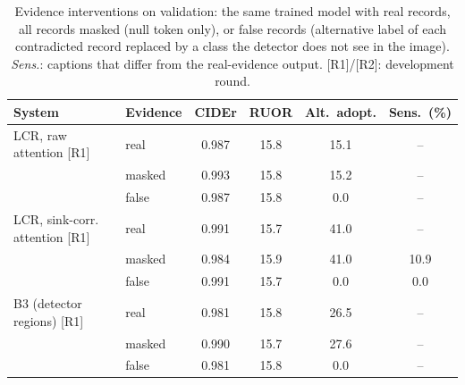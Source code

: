 \begin{table}[t]
\caption{Evidence interventions on validation: the same trained model with real records, all records masked
(null token only), or false records (alternative label of each contradicted record replaced by a class the
detector does not see in the image). \emph{Sens.}: captions that differ from the real-evidence output.
[R1]/[R2]: development round.}
\label{tab:interv}
\centering\footnotesize\setlength{\tabcolsep}{3pt}
\begin{tabular}{@{}p{2.3cm}lcccc@{}}
\toprule
System & Evidence & CIDEr & RUOR & Alt.\ adopt. & Sens.\ (\%) \\
\midrule
LCR, raw attention [R1] & real & 0.987 & 15.8 & 15.1 & -- \\
 & masked & 0.993 & 15.8 & 15.2 & -- \\
 & false & 0.987 & 15.8 & 0.0 & -- \\
\addlinespace
LCR, sink-corr. attention [R1] & real & 0.991 & 15.7 & 41.0 & -- \\
 & masked & 0.984 & 15.9 & 41.0 & 10.9 \\
 & false & 0.991 & 15.7 & 0.0 & 0.0 \\
\addlinespace
B3 (detector regions) [R1] & real & 0.981 & 15.8 & 26.5 & -- \\
 & masked & 0.990 & 15.7 & 27.6 & -- \\
 & false & 0.981 & 15.8 & 0.0 & -- \\
\bottomrule
\end{tabular}
\end{table}
